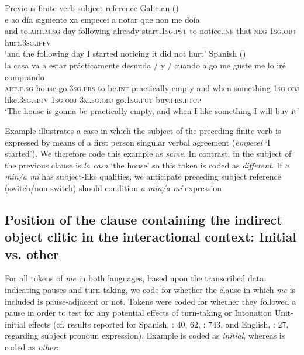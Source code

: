 \documentclass[output=paper]{langscibook}
\begin{document}
\ea%
    Previous finite verb subject reference\label{ex:brown:8}
    \ea  Galician () \label{ex:brown:8a}\\
    \gll e ao día siguiente xa empecei a notar que non me doía\\
         and to.\textsc{art.m.sg} day following already start.\textsc{1sg.pst} to notice.\textsc{inf} that \textsc{neg} \textsc{1sg.obj} hurt.\textsc{3sg.ipfv} \\
    \glt ‘and the following day I started noticing it did not hurt’ 
    \ex  Spanish ()\label{ex:brown:8b}\\
    \gll la casa va a estar prácticamente desnuda / y / cuando algo me guste me lo iré comprando\\
         \textsc{art.f.sg} house go.\textsc{3sg.prs} to be.\textsc{inf} practically empty {} and  {} when something \textsc{1sg.obj} like.\textsc{3sg.sbjv} \textsc{1sg.obj} \textsc{3m.sg.obj} go.\textsc{1sg.fut} buy.\textsc{prs.ptcp}\\
    \glt ‘The house is gonna be practically empty, and when I like something I will buy it’
    \z
\z

Example  illustrates a case in which the subject of the preceding finite verb is expressed by means of a first person singular verbal agreement (\textit{empecei} ‘I started’). We therefore code this example as \textit{same}. In contrast, in  the subject of the previous clause is \textit{la casa} ‘the house’ so this token is coded as \textit{different}. If \textit{a min\slash a mí} has subject-like qualities, we anticipate preceding subject reference (switch/non-switch) should condition \textit{a min\slash a mí} expression


\subsection{Position of the clause containing the indirect object clitic in the interactional context: Initial vs. other}
For all tokens of \textit{me} in both languages, based upon the transcribed data, indicating pauses and turn-taking, we code for whether the clause in which \textit{me} is included is pause-adjacent or not. Tokens were coded for whether they followed a pause in order to test for any potential effects of turn-taking or Intonation Unit-initial effects (cf. results reported for Spanish, \citealt{Bentivoglio1987}: 40, 62, \citealt{TravisCacoullos2012}: 743, and English, \citealt{TorresCacoullosTravis2014}: 27, regarding subject pronoun expression). Example  is coded as \textit{initial}, whereas  is coded as \textit{other}:
\end{document}
